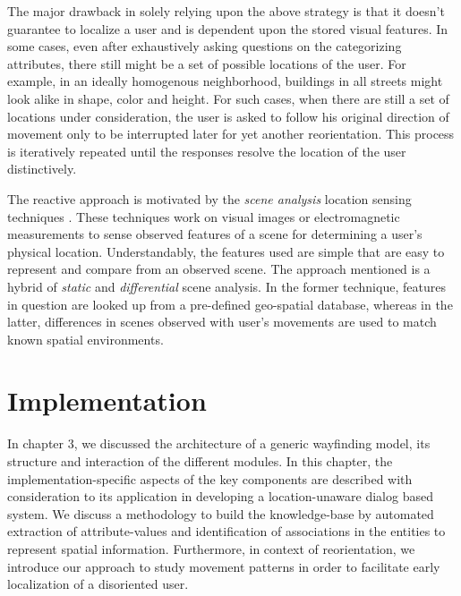 \documentclass{iitkthesis}
\begin{document}
The major drawback in solely relying upon the above strategy is that it doesn't guarantee to localize a user and is dependent upon the stored visual features. In some cases, even after exhaustively asking questions on the categorizing attributes, there still might be a set of possible locations of the user. For example, in an ideally homogenous neighborhood, buildings in all streets might look alike in shape, color and height. For such cases, when there are still a set of locations under consideration, the user is asked to follow his original direction of movement only to be interrupted later for yet another reorientation. This process is iteratively repeated until the responses resolve the location of the user distinctively.

The reactive approach is motivated by the \textit{scene analysis} location sensing techniques \cite{hightower}. These techniques work on visual images or electromagnetic measurements to sense observed features of a scene for determining a user's physical location. Understandably, the features used are simple that are easy to represent and compare from an observed scene. The approach mentioned is a hybrid of \textit{static} and \textit{differential} scene analysis. In the former technique, features in question are looked up from a pre-defined geo-spatial database, whereas in the latter, differences in scenes observed with user's movements are used to match known spatial environments.

 \chapter{Implementation}
In chapter 3, we discussed the architecture of a generic wayfinding model, its structure and interaction of the different modules. In this chapter, the implementation-specific aspects of the key components are described with consideration to its application in developing a location-unaware dialog based system. We discuss a methodology to build the knowledge-base by automated extraction of attribute-values and identification of associations in the entities to represent spatial information. Furthermore, in context of reorientation, we introduce our approach to study movement patterns in order to facilitate early localization of a disoriented user.
\end{document}
